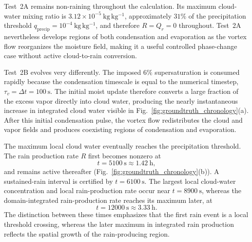 \documentclass[12pt]{article}
\begin{document}
Test~2A remains non-raining throughout
the calculation. Its maximum cloud-water mixing ratio is
$3.12\times10^{-5}~\mathrm{kg\,kg^{-1}}$, approximately $31\%$ of the
precipitation threshold
$q_{\mathrm{precip}}=10^{-4}~\mathrm{kg\,kg^{-1}}$, and therefore
$R=Q_r=0$ throughout. Test~2A nevertheless develops regions of both
condensation and evaporation as the vortex flow reorganizes the moisture
field, making it a useful controlled phase-change case without active
cloud-to-rain conversion.

Test~2B evolves very differently. The imposed $6\%$ supersaturation is
consumed rapidly because the condensation timescale is equal to the numerical
timestep, $\tau_v=\Delta t=100~\mathrm{s}$. The initial moist update therefore
converts a large fraction of the excess vapor directly into cloud water,
producing the nearly instantaneous increase in integrated cloud water visible
in Fig.~\ref{fig:groundtruth_chronology}(a). After this initial condensation
pulse, the vortex flow redistributes the cloud and vapor fields and produces
coexisting regions of condensation and evaporation.

The maximum local cloud water eventually reaches the precipitation threshold.
The rain production rate $R$ first becomes nonzero at
\begin{equation}
	t=5100~\mathrm{s}\approx1.42~\mathrm{h},
\end{equation}
and remains active thereafter (Fig.~\ref{fig:groundtruth_chronology}(b)). 
A sustained-rain interval is certified by
$t=6100~\mathrm{s}$. The largest local cloud-water concentration and local
rain-production rate occur near $t=8900~\mathrm{s}$, whereas the
domain-integrated rain-production rate reaches its maximum later, at
\begin{equation}
	t=12000~\mathrm{s}\approx3.33~\mathrm{h}.
\end{equation}
The distinction between these times emphasizes that the first rain event is a
local threshold crossing, whereas the later maximum in integrated rain
production reflects the spatial growth of the rain-producing region.
\end{document}
